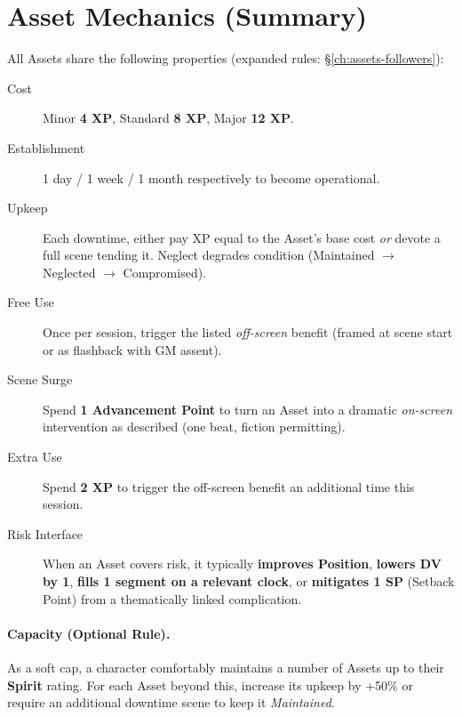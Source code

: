 \section{Asset Mechanics (Summary)}
All Assets share the following properties (expanded rules: \S\ref{ch:assets-followers}):
\begin{description}
  \item[Cost] Minor \textbf{4 XP}, Standard \textbf{8 XP}, Major \textbf{12 XP}. 
  \item[Establishment] 1 day / 1 week / 1 month respectively to become operational.
  \item[Upkeep] Each downtime, either pay XP equal to the Asset’s base cost \emph{or} devote a full scene tending it. Neglect degrades condition (Maintained $\rightarrow$ Neglected $\rightarrow$ Compromised). 
  \item[Free Use] Once per session, trigger the listed \emph{off-screen} benefit (framed at scene start or as flashback with GM assent).
  \item[Scene Surge] Spend \textbf{1 Advancement Point} to turn an Asset into a dramatic \emph{on-screen} intervention as described (one beat, fiction permitting). 
  \item[Extra Use] Spend \textbf{2 XP} to trigger the off-screen benefit an additional time this session.
  \item[Risk Interface] When an Asset covers risk, it typically \textbf{improves Position}, \textbf{lowers DV by 1}, \textbf{fills 1 segment on a relevant clock}, or \textbf{mitigates 1 SP} (Setback Point) from a thematically linked complication. 
\end{description}

\paragraph{Capacity (Optional Rule).}
As a soft cap, a character comfortably maintains a number of Assets up to their \textbf{Spirit} rating. For each Asset beyond this, increase its upkeep by +50\% or require an additional downtime scene to keep it \emph{Maintained}.

